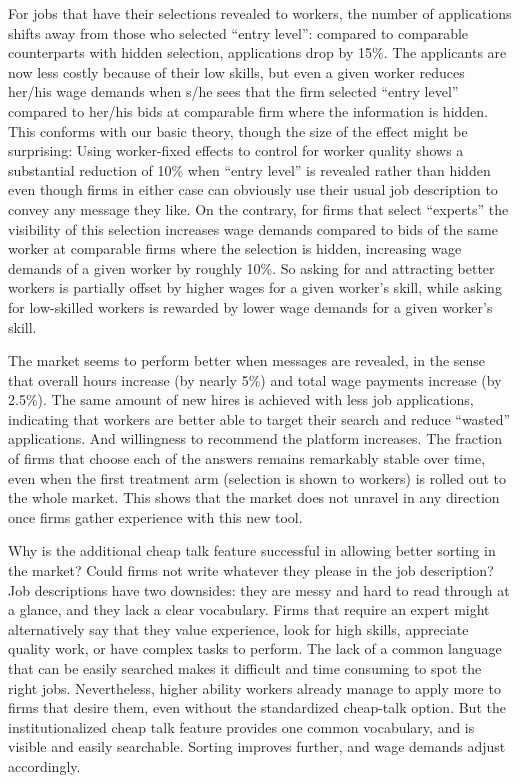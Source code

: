 \documentclass[12pt]{article}
\begin{document}
 For jobs that have their selections revealed to workers, the number of applications shifts away from those who selected ``entry level'': compared to comparable counterparts with hidden selection, applications drop by 15\%. The applicants are now less costly because of their low skills, but even a given worker reduces her/his wage demands when s/he sees that the firm selected ``entry level'' compared to her/his bids at comparable firm where the information is hidden. This conforms with our basic theory, though the size of the effect might be surprising: Using worker-fixed effects to control for worker quality shows a substantial reduction of 10\% when ``entry level'' is revealed rather than hidden even though firms in either case can obviously use their usual job description to convey any message they like. On the contrary, for firms that select ``experts'' the visibility of this selection increases wage demands compared to bids of the same worker at comparable firms where the selection is hidden, increasing wage demands of a given worker by roughly 10\%. So asking for and attracting better workers is partially offset by higher wages for a given worker's skill, while asking for low-skilled workers is rewarded by lower wage demands for a given worker's skill.  
 
 The market seems to perform better when messages are revealed, in the sense that overall hours increase (by nearly 5\%) and total wage payments increase (by 2.5\%). The same amount of new hires is achieved with less job applications, indicating that workers are better able to target their search and reduce ``wasted'' applications. And willingness to recommend the platform increases. The fraction of firms that choose each of the answers remains remarkably stable over time, even when the first treatment arm (selection is shown to workers) is rolled out to the whole market. This shows that the market does not unravel in any direction once firms gather experience with this new tool. 

Why is the additional cheap talk feature successful in allowing better sorting in the market? Could firms not write whatever they please in the job description? Job descriptions have two downsides: they are messy and hard to read through at a glance, and they lack a clear vocabulary. Firms that require an expert might alternatively say that they value experience, look for high skills, appreciate quality work, or have complex tasks to perform. The lack of a common language that can be easily searched makes it difficult and time consuming to spot the right jobs. Nevertheless, higher ability workers already manage to apply more to firms that desire them, even without the standardized cheap-talk option. But the institutionalized cheap talk feature provides one common vocabulary, and is visible and easily searchable. Sorting improves further, and wage demands adjust accordingly. 
\end{document}

